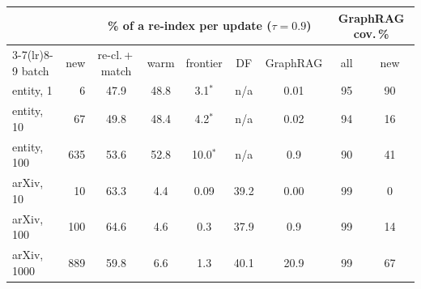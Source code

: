 \begin{tabular}{l r c c c c c c c}
\toprule
 & & \multicolumn{5}{c}{\% of a re-index per update ($\tau=0.9$)} & \multicolumn{2}{c}{GraphRAG cov.\,\%}\\
\cmidrule(lr){3-7}\cmidrule(lr){8-9}
batch & new & re-cl.\,+\,match & warm & frontier & DF & GraphRAG & all & new\\
\midrule
entity, 1 & 6 & 47.9 & 48.8 & 3.1$^{*}$ & n/a & 0.01 & 95 & 90 \\
entity, 10 & 67 & 49.8 & 48.4 & 4.2$^{*}$ & n/a & 0.02 & 94 & 16 \\
entity, 100 & 635 & 53.6 & 52.8 & 10.0$^{*}$ & n/a & 0.9 & 90 & 41 \\
\midrule
arXiv, 10 & 10 & 63.3 & 4.4 & 0.09 & 39.2 & 0.00 & 99 & 0 \\
arXiv, 100 & 100 & 64.6 & 4.6 & 0.3 & 37.9 & 0.9 & 99 & 14 \\
arXiv, 1000 & 889 & 59.8 & 6.6 & 1.3 & 40.1 & 20.9 & 99 & 67 \\
\bottomrule
\end{tabular}
